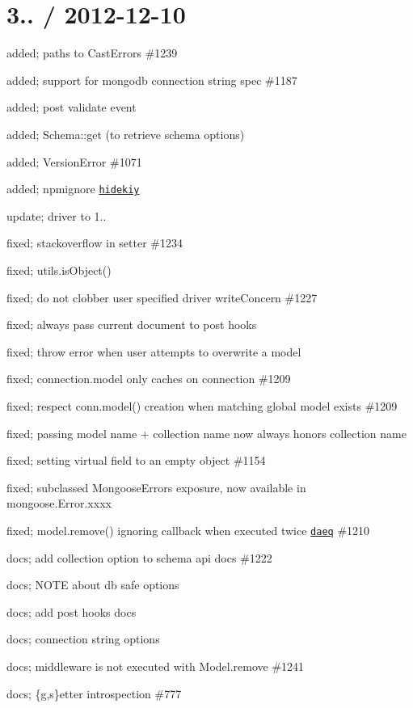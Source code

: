 \section*{3.. / 2012-\/12-\/10 }


\begin{DoxyItemize}
\item added; paths to Cast\+Errors \#1239
\item added; support for mongodb connection string spec \#1187
\item added; post validate event
\item added; Schema\+::get (to retrieve schema options)
\item added; Version\+Error \#1071
\item added; npmignore \href{https://github.com/hidekiy}{\tt hidekiy}
\item update; driver to 1..
\item fixed; stackoverflow in setter \#1234
\item fixed; utils.\+is\+Object()
\item fixed; do not clobber user specified driver write\+Concern \#1227
\item fixed; always pass current document to post hooks
\item fixed; throw error when user attempts to overwrite a model
\item fixed; connection.\+model only caches on connection \#1209
\item fixed; respect conn.\+model() creation when matching global model exists \#1209
\item fixed; passing model name + collection name now always honors collection name
\item fixed; setting virtual field to an empty object \#1154
\item fixed; subclassed Mongoose\+Errors exposure, now available in mongoose.\+Error.\+xxxx
\item fixed; model.\+remove() ignoring callback when executed twice \href{https://github.com/daeq}{\tt daeq} \#1210
\item docs; add collection option to schema api docs \#1222
\item docs; N\+O\+TE about db safe options
\item docs; add post hooks docs
\item docs; connection string options
\item docs; middleware is not executed with Model.\+remove \#1241
\item docs; \{g,s\}etter introspection \#777

\end{DoxyItemize}
